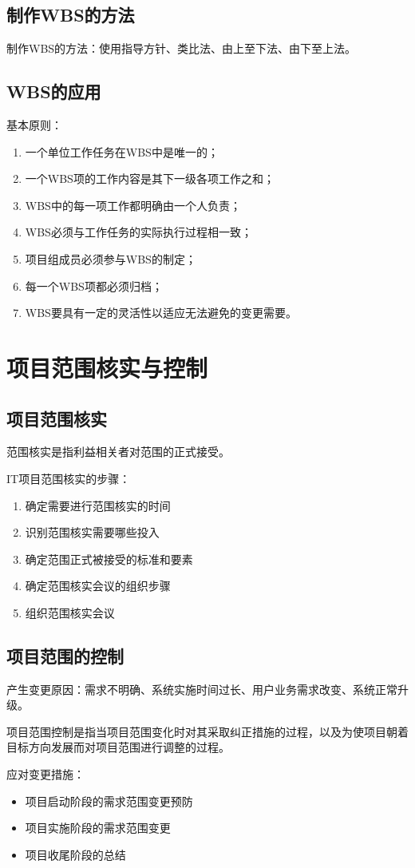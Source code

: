 \subsection{制作WBS的方法}
制作WBS的方法：使用指导方针、类比法、由上至下法、由下至上法。
\subsection{WBS的应用}
基本原则：
\begin{enumerate}
	\item 一个单位工作任务在WBS中是唯一的；   
	\item 一个WBS项的工作内容是其下一级各项工作之和；    
	\item WBS中的每一项工作都明确由一个人负责；
	\item WBS必须与工作任务的实际执行过程相一致；
	\item 项目组成员必须参与WBS的制定；
	\item 每一个WBS项都必须归档；
	\item WBS要具有一定的灵活性以适应无法避免的变更需要。 
\end{enumerate}
\section{项目范围核实与控制}
\subsection{项目范围核实}
范围核实是指利益相关者对范围的正式接受。
\par IT项目范围核实的步骤：
\begin{enumerate}
	\item 确定需要进行范围核实的时间
	\item 识别范围核实需要哪些投入
	\item 确定范围正式被接受的标准和要素
	\item 确定范围核实会议的组织步骤
	\item 组织范围核实会议
\end{enumerate}
\subsection{项目范围的控制}
产生变更原因：需求不明确、系统实施时间过长、用户业务需求改变、系统正常升级。 
\par 项目范围控制是指当项目范围变化时对其采取纠正措施的过程，以及为使项目朝着目标方向发展而对项目范围进行调整的过程。
\par 应对变更措施：
\begin{itemize}
	\item 项目启动阶段的需求范围变更预防
	\item 项目实施阶段的需求范围变更
	\item 项目收尾阶段的总结
\end{itemize}
